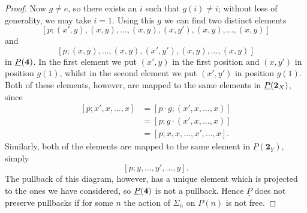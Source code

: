 \begin{proof}
Now $g \neq e$, so there exists an $i$ such that $g(i) \neq i$; without loss of generality, we may take $i=1$. Using this $g$ we can find two distinct elements
    \[
        \left[p;(x',y),(x,y),\ldots,(x,y),(x,y'),(x,y),\ldots,(x,y)\right]
    \]
and
    \[
        \left[p;(x,y),\ldots,(x,y),(x',y'),(x,y),\ldots,(x,y)\right]
    \]
in $\underline{P}(\mathbf{4})$. In the first element we put $(x',y)$ in the first position and $(x,y')$ in position $g(1)$, whilst in the second element we put $(x',y')$ in position $g(1)$. Both of these elements, however, are mapped to the same elements in $\underline{P}(\mathbf{2}_X)$, since
    \begin{align*}
           \left[p; x', x, \ldots, x\right]&= \left[p \cdot g; (x', x, \ldots, x)\right]\\
          &= \left[p;g\cdot (x', x, \ldots, x)\right]\\
          &= \left[p;x,x,\ldots,x',\ldots,x\right].
    \end{align*}
Similarly, both of the elements are mapped to the same element in $\underline{P}(\mathbf{2}_Y)$, simply
    \[
        \left[p;y,\ldots,y', \ldots, y\right].
    \]
The pullback of this diagram, however, has a unique element which is projected to the ones we have considered, so $\underline{P}(\mathbf{4})$ is not a pullback. Hence $\underline{P}$ does not preserve pullbacks if for some $n$ the action of $\Sigma_n$ on $P(n)$ is not free.


\end{proof}
